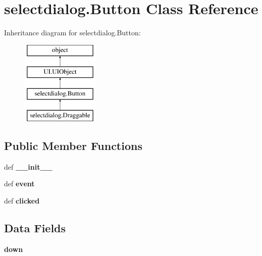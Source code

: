 \hypertarget{classselectdialog_1_1Button}{\section{selectdialog.\-Button Class Reference}
\label{classselectdialog_1_1Button}
}
Inheritance diagram for selectdialog.\-Button\-:\begin{figure}[H]
\begin{center}
\leavevmode
\includegraphics[height=4.000000cm]{classselectdialog_1_1Button}
\end{center}
\end{figure}
\subsection*{Public Member Functions}
\begin{DoxyCompactItemize}
\item 
\hypertarget{classselectdialog_1_1Button_a08071ed3d038becc84abdd009fdec51f}{def {\bfseries \-\_\-\-\_\-init\-\_\-\-\_\-}}\label{classselectdialog_1_1Button_a08071ed3d038becc84abdd009fdec51f}

\item 
\hypertarget{classselectdialog_1_1Button_a9c6db95e7982a93ba8f99826ebb0a8f0}{def {\bfseries event}}\label{classselectdialog_1_1Button_a9c6db95e7982a93ba8f99826ebb0a8f0}

\item 
\hypertarget{classselectdialog_1_1Button_a64806a7a8fe018d99f65008046e252fe}{def {\bfseries clicked}}\label{classselectdialog_1_1Button_a64806a7a8fe018d99f65008046e252fe}

\end{DoxyCompactItemize}
\subsection*{Data Fields}
\begin{DoxyCompactItemize}
\item 
\hypertarget{classselectdialog_1_1Button_a967a48ded59987a3bf29461b1e5259c1}{{\bfseries down}}\label{classselectdialog_1_1Button_a967a48ded59987a3bf29461b1e5259c1}

\end{DoxyCompactItemize}

